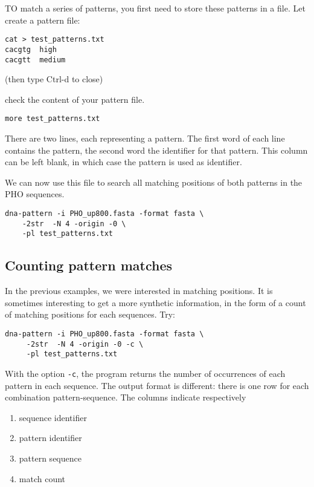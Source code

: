 TO match a series of patterns, you first need to store these patterns
in a file. Let create a pattern file:

\begin{verbatim}
cat > test_patterns.txt
cacgtg	high
cacgtt	medium
\end{verbatim}
(then type Ctrl-d to close)

check the content of your pattern file.
\begin{verbatim}
more test_patterns.txt
\end{verbatim}

There are two lines, each representing a pattern. The first word of
each line contains the pattern, the second word the identifier for
that pattern. This column can be left blank, in which case the pattern
is used as identifier.

We can now use this file to search all matching positions of both
patterns in the PHO sequences.

\begin{verbatim}
dna-pattern -i PHO_up800.fasta -format fasta \
    -2str  -N 4 -origin -0 \
    -pl test_patterns.txt
\end{verbatim}

\subsection{Counting pattern matches}

In the previous examples, we were interested in matching positions. It
is sometimes interesting to get a more synthetic information, in the
form of a count of matching positions for each sequences. Try:

\begin{verbatim}
dna-pattern -i PHO_up800.fasta -format fasta \ 
     -2str  -N 4 -origin -0 -c \
     -pl test_patterns.txt
\end{verbatim}

With the option \texttt{-c}, the program returns the number of
occurrences of each pattern in each sequence. The output format is
different: there is one row for each combination pattern-sequence. The
columns indicate respectively
\begin{enumerate}
\item sequence identifier
\item pattern identifier
\item pattern sequence
\item match count
\end{enumerate}

